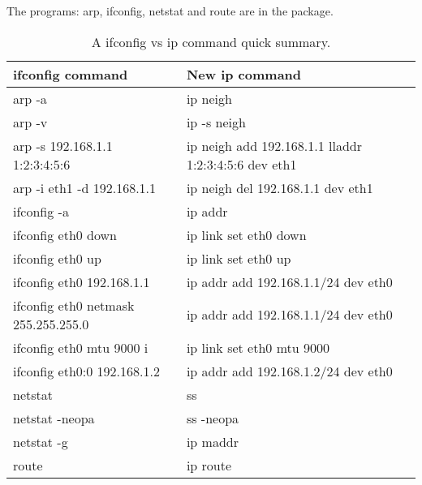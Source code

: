 The programs: arp, ifconfig, netstat and route are in the 
package.

\begin{table}[h!]
\centering
\begingroup \fontsize{10pt}{10pt}
\selectfont
\begin{tabular}{| l | l |}
\hline
ifconfig command & New ip command   \\
\hline
arp -a                              & ip neigh    \\ 
arp -v                              & ip -s neigh    \\ 
arp -s 192.168.1.1 1:2:3:4:5:6      & ip neigh add 192.168.1.1 lladdr 1:2:3:4:5:6 dev eth1    \\ 
arp -i eth1 -d 192.168.1.1          & ip neigh del 192.168.1.1 dev eth1    \\ 
ifconfig -a                         & ip addr    \\ 
ifconfig eth0 down                  & ip link set eth0 down    \\ 
ifconfig eth0 up                    & ip link set eth0 up    \\ 
ifconfig eth0 192.168.1.1           & ip addr add 192.168.1.1/24 dev eth0    \\ 
ifconfig eth0 netmask 255.255.255.0 & ip addr add 192.168.1.1/24 dev eth0    \\ 
ifconfig eth0 mtu 9000 i            & ip link set eth0 mtu 9000    \\ 
ifconfig eth0:0 192.168.1.2         & ip addr add 192.168.1.2/24 dev eth0    \\ 
netstat                             & ss    \\ 
netstat -neopa                      & ss -neopa    \\ 
netstat -g                          & ip maddr    \\ 
route                               & ip route    \\ 
\hline
\end{tabular}
\endgroup
\caption[Net-tools vs IProute2]{A ifconfig vs ip command quick summary.}
\label{table:ifconfigvsipcommand}
\end{table}

